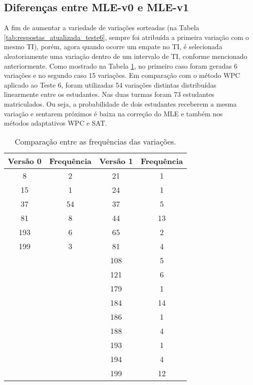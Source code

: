 \subsection{Diferenças entre MLE-v0 e  MLE-v1}

A fim de aumentar a variedade de variações sorteadas (na Tabela \ref{tab:respostas_atualizada_teste6}, sempre foi atribuída a primeira variação com o mesmo TI), porém, agora quando ocorre um empate no TI, é selecionada aleatoriamente uma variação dentro de um intervalo de TI, conforme mencionado anteriormente. Como mostrado na Tabela \ref{tab:MLE_frequencias}, no primeiro caso foram geradas 6 variações e no segundo caso 15 variações. Em comparação com o método WPC aplicado ao Teste 6, foram utilizadas 54 variações distintas distribuídas linearmente entre os estudantes. Nas duas turmas foram 73 estudantes matriculados. Ou seja, a probabilidade de dois estudantes receberem a mesma variação e sentarem próximos é baixa na correção do MLE e também nos métodos adaptativos WPC e SAT.

\begin{table}[!ht]
    \centering
    \caption{Comparação entre as frequências das variações.}
    \label{tab:MLE_frequencias}
    \begin{tabular}{|c|c|c|c|}
        \hline
        \cellcolor{green!25} \textbf{Versão 0} & \cellcolor{green!25} \textbf{Frequência} & \cellcolor{yellow!25} \textbf{Versão 1} & \cellcolor{yellow!25} \textbf{Frequência} \\
        \hline
        8 & 2 & 21 & 1 \\
        15 & 1 & 24 & 1 \\
        37 & 54 & 37 & 5 \\
        81 & 8 & 44 & 13 \\
        193 & 6 & 65 & 2 \\
        199 & 3 & 81 & 4 \\
        & & 108 & 5 \\
        & & 121 & 6 \\
        & & 179 & 1 \\
        & & 184 & 14 \\
        & & 186 & 1 \\
        & & 188 & 4 \\
        & & 193 & 1 \\
        & & 194 & 4 \\
        & & 199 & 12 \\
        \hline
    \end{tabular}
\end{table}

